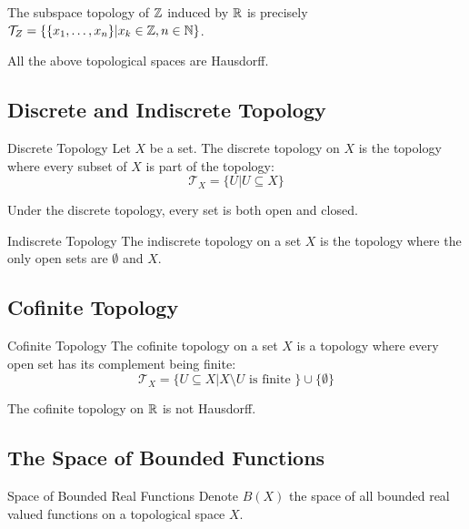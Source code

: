 \documentclass[a4paper]{article}
\begin{document}
\begin{prp}{}{} The subspace topology of $\mathbb{Z}$ induced by $\mathbb{R}$ is precisely $\mathcal{T}_Z=\{\{x_1,\dots,x_n\}|x_k\in\mathbb{Z},n\in\mathbb{N}\}$. 
\end{prp}

\begin{prp}{}{} All the above topological spaces are Hausdorff. 
\end{prp}

\subsection{Discrete and Indiscrete Topology}
\begin{defn}{Discrete Topology}{} Let $X$ be a set. The discrete topology on $X$ is the topology where every subset of $X$ is part of the topology: $$\mathcal{T}_X=\{U|U\subseteq X\}$$
\end{defn}

\begin{prp}{}{} Under the discrete topology, every set is both open and closed. 
\end{prp}

\begin{defn}{Indiscrete Topology}{} The indiscrete topology on a set $X$ is the topology where the only open sets are $\emptyset$ and $X$. 
\end{defn}

\subsection{Cofinite Topology}
\begin{defn}{Cofinite Topology}{} The cofinite topology on a set $X$ is a topology where every open set has its complement being finite: $$\mathcal{T}_X=\{U\subseteq X|X\setminus U\text{ is finite }\}\cup\{\emptyset\}$$
\end{defn}

\begin{prp}{}{} The cofinite topology on $\mathbb{R}$ is not Hausdorff. 
\end{prp}

\subsection{The Space of Bounded Functions}
\begin{defn}{Space of Bounded Real Functions}{} Denote $B(X)$ the space of all bounded real valued functions on a topological space $X$. 
\end{defn}
\end{document}
